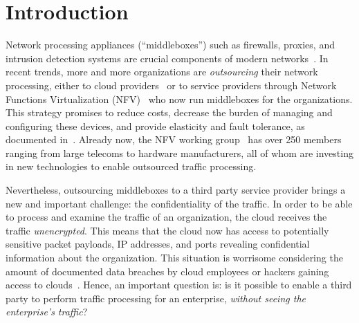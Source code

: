 

\section{Introduction}\label{sec:intro}


    Network processing appliances (``middleboxes'') such as firewalls, proxies, and intrusion detection systems are crucial components of modern networks~\cite{aplomb}. 
     In recent trends, more and more organizations are {\it outsourcing} their network processing, either to cloud providers~\cite{aplomb, aryaka, zscalar} or to service providers through Network Functions Virtualization (NFV)~\cite{nfv} who now run  middleboxes for the organizations. This strategy promises to reduce costs, decrease the burden of managing and configuring these devices, and provide elasticity and fault tolerance, as documented in~\cite{aplomb}.
Already now, the NFV working group~\cite{nfvwg} has over 250 members ranging from large telecoms to hardware manufacturers, all of whom are investing in new technologies to enable outsourced traffic processing.
   
   Nevertheless, outsourcing middleboxes to a third party service provider brings a new and important challenge: the confidentiality of the traffic. In order to be able to process and examine the traffic of an organization, the cloud  receives  the traffic {\em unencrypted}.  This means that the cloud now has access to potentially sensitive packet payloads,  IP addresses, and ports revealing confidential information about the organization. This situation is worrisome considering the amount of documented data breaches by cloud employees or hackers gaining access to clouds~\cite{XXX}.
   Hence, an important question is: is it possible to enable a third party to perform traffic processing for an enterprise, {\em without seeing the enterprise's traffic}?
   
   
   

